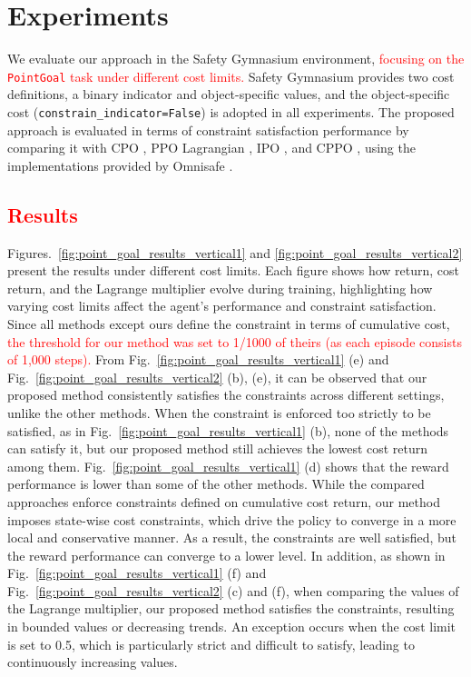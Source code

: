 \section{Experiments}

We evaluate our approach in the Safety Gymnasium \cite{ji2023safety} environment, \textcolor{red}{focusing on the \texttt{PointGoal} task under different cost limits.}
Safety Gymnasium provides two cost definitions, a binary indicator and object-specific values, and the object-specific cost (\texttt{constrain\_indicator=False}) is adopted in all experiments.
The proposed approach is evaluated in terms of constraint satisfaction performance by comparing it with CPO \cite{achiam2017constrained}, PPO Lagrangian \cite{ray2019benchmarking}, IPO \cite{liu2020ipo}, and CPPO \cite{stooke2020responsive}, using the implementations provided by Omnisafe \cite{ji2024omnisafe}.

\subsection{\textcolor{red}{Results}}

Figures.~\ref{fig:point_goal_results_vertical1} and \ref{fig:point_goal_results_vertical2} present the results under different cost limits.
Each figure shows how return, cost return, and the Lagrange multiplier evolve during training, highlighting how varying cost limits affect the agent's performance and constraint satisfaction.
Since all methods except ours define the constraint in terms of cumulative cost, \textcolor{red}{the threshold for our method was set to 1/1000 of theirs (as each episode consists of 1,000 steps).}
From Fig.~\ref{fig:point_goal_results_vertical1} (e) and Fig.~\ref{fig:point_goal_results_vertical2} (b), (e), it can be observed that our proposed method consistently satisfies the constraints across different settings, unlike the other methods.
When the constraint is enforced too strictly to be satisfied, as in Fig.~\ref{fig:point_goal_results_vertical1} (b), none of the methods can satisfy it, but our proposed method still achieves the lowest cost return among them.
Fig.~\ref{fig:point_goal_results_vertical1} (d) shows that the reward performance is lower than some of the other methods. 
While the compared approaches enforce constraints defined on cumulative cost return, our method imposes state-wise cost constraints, which drive the policy to converge in a more local and conservative manner. 
As a result, the constraints are well satisfied, but the reward performance can converge to a lower level.
In addition, as shown in Fig.~\ref{fig:point_goal_results_vertical1} (f) and Fig.~\ref{fig:point_goal_results_vertical2} (c) and (f), when comparing the values of the Lagrange multiplier, our proposed method satisfies the constraints, resulting in bounded values or decreasing trends.
An exception occurs when the cost limit is set to 0.5, which is particularly strict and difficult to satisfy, leading to continuously increasing values.

